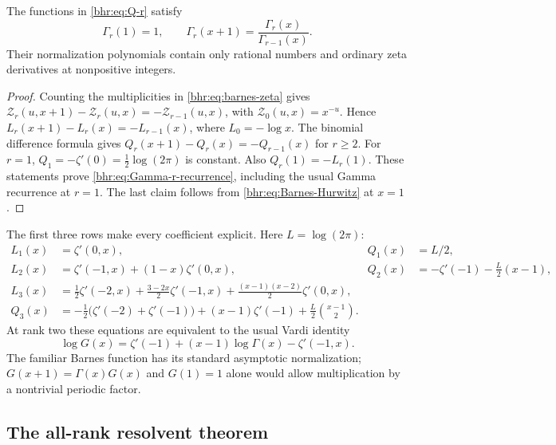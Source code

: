\begin{proposition}\label{bhr:prop:normalization}
The functions in \eqref{bhr:eq:Q-r} satisfy
\begin{equation}\label{bhr:eq:Gamma-r-recurrence}
 \Gamma_r(1)=1,\qquad
 \Gamma_r(x+1)=\frac{\Gamma_r(x)}{\Gamma_{r-1}(x)}.
\end{equation}
Their normalization polynomials contain only rational numbers and
ordinary zeta derivatives at nonpositive integers.
\end{proposition}
\begin{proof}
Counting the multiplicities in \eqref{bhr:eq:barnes-zeta} gives
$\mathcal Z_r(u,x+1)-\mathcal Z_r(u,x)=-\mathcal Z_{r-1}(u,x)$, with
$\mathcal Z_0(u,x)=x^{-u}$. Hence
$L_r(x+1)-L_r(x)=-L_{r-1}(x)$, where $L_0=-\log x$.
The binomial difference formula gives
$Q_r(x+1)-Q_r(x)=-Q_{r-1}(x)$ for $r\ge2$.
For $r=1$, $Q_1=-\zeta'(0)=\tfrac12\log(2\pi)$ is
constant. Also $Q_r(1)=-L_r(1)$. These statements prove
\eqref{bhr:eq:Gamma-r-recurrence}, including the usual Gamma
recurrence at $r=1$. The last claim follows from
\eqref{bhr:eq:Barnes-Hurwitz} at $x=1$.
\end{proof}

The first three rows make every coefficient explicit. Here
$L=\log(2\pi)$:
\begin{align}
 L_1(x)&=\zeta'(0,x),& Q_1(x)&=L/2,\label{bhr:eq:rank1}\\
 L_2(x)&=\zeta'(-1,x)+(1-x)\zeta'(0,x),&
 Q_2(x)&=-\zeta'(-1)-\tfrac L2(x-1),\label{bhr:eq:rank2}\\
 L_3(x)&=\tfrac12\zeta'(-2,x)
       +\tfrac{3-2x}{2}\zeta'(-1,x)
       +\tfrac{(x-1)(x-2)}2\zeta'(0,x),\label{bhr:eq:rank3a}\\
 Q_3(x)&=-\tfrac12\bigl(\zeta'(-2)+\zeta'(-1)\bigr)
       +(x-1)\zeta'(-1)+\tfrac L2\binom{x-1}{2}.
       \label{bhr:eq:rank3b}
\end{align}
At rank two these equations are equivalent to the usual Vardi
identity
\begin{equation}\label{bhr:eq:Vardi}
 \log G(x)=\zeta'(-1)+(x-1)\log\Gamma(x)-\zeta'(-1,x).
\end{equation}
The familiar Barnes function has its standard asymptotic
normalization; $G(x+1)=\Gamma(x)G(x)$ and $G(1)=1$ alone
would allow multiplication by a nontrivial periodic factor.

\subsection{The all-rank resolvent theorem}

